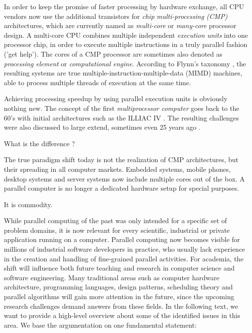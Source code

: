 \documentclass[a4paper]{article}
\begin{document}
In order to keep the promise of faster processing by hardware exchange, all CPU vendors now use the additional transistors for \emph{chip multi-processing (CMP)} architectures, which are currently named as \emph{multi-core} or \emph{many-core} processor design. A multi-core CPU combines multiple independent \emph{execution units} into one processor chip, in order to execute multiple instructions in a truly parallel fashion ('get help'). The cores of a CMP processor are sometimes also denoted as \emph{processing element} or \emph{computational engine}. According to Flynn's taxonomy \cite{flynn72}, the resulting systems are true multiple-instruction-multiple-data (MIMD) machines, able to process multiple threads of execution at the same time.  

Achieving processing speedup by using parallel execution units is obviously nothing new. The concept of the first \emph{multiprocessor computer} goes back to the 60's with initial architectures such as the ILLIAC IV \cite{illiac4}. The resulting challenges were also discussed to large extend, sometimes even 25 years ago \cite{cmpmyths}.

What is the difference ?
 
The true paradigm shift today is not the realization of CMP architectures, but their spreading in all computer markets. Embedded systems, mobile phones, desktop systems and server systems now include multiple cores out of the box. A parallel computer is no longer a dedicated hardware setup for special purposes. 

It is commodity.

While parallel computing of the past was only intended for a specific set of problem domains, it is now relevant for every scientific, industrial or private application running on a computer. Parallel computing now becomes visible for millions of industrial software developers in practice, who usually lack experience in the creation and handling of fine-grained parallel activities. For academia, the shift will influence both future teaching and research in computer science and software engineering. Many traditional areas such as computer hardware architecture, programming languages, design patterns, scheduling theory and parallel algorithms will gain more attention in the future, since the upcoming research challenges demand answers from these fields. In the following text, we want to provide a high-level overview about some of the identified issues in this area. We base the argumentation on one fundamental statement: 
\end{document}
